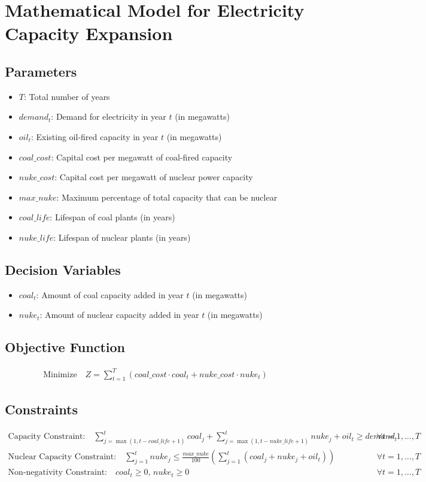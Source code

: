 \documentclass{article}
\begin{document}
\section*{Mathematical Model for Electricity Capacity Expansion}

\subsection*{Parameters}
\begin{itemize}
    \item $T$: Total number of years
    \item $demand_t$: Demand for electricity in year $t$ (in megawatts)
    \item $oil_t$: Existing oil-fired capacity in year $t$ (in megawatts)
    \item $coal\_cost$: Capital cost per megawatt of coal-fired capacity
    \item $nuke\_cost$: Capital cost per megawatt of nuclear power capacity
    \item $max\_nuke$: Maximum percentage of total capacity that can be nuclear
    \item $coal\_life$: Lifespan of coal plants (in years)
    \item $nuke\_life$: Lifespan of nuclear plants (in years)
\end{itemize}

\subsection*{Decision Variables}
\begin{itemize}
    \item $coal_t$: Amount of coal capacity added in year $t$ (in megawatts)
    \item $nuke_t$: Amount of nuclear capacity added in year $t$ (in megawatts)
\end{itemize}

\subsection*{Objective Function}
\begin{align*}
    \text{Minimize} \quad Z = \sum_{t=1}^{T} (coal\_cost \cdot coal_t + nuke\_cost \cdot nuke_t)
\end{align*}

\subsection*{Constraints}
\begin{align*}
    \text{Capacity Constraint:} \quad \sum_{j=\max(1, t - coal\_life + 1)}^{t} coal_j + \sum_{j=\max(1, t - nuke\_life + 1)}^{t} nuke_j + oil_t \geq demand_t & \quad \forall t = 1, \ldots, T \\
    \text{Nuclear Capacity Constraint:} \quad \sum_{j=1}^{t} nuke_j \leq \frac{max\_nuke}{100} \left( \sum_{j=1}^{t} (coal_j + nuke_j + oil_t) \right) & \quad \forall t = 1, \ldots, T \\
    \text{Non-negativity Constraint:} \quad coal_t \geq 0, \, nuke_t \geq 0 & \quad \forall t = 1, \ldots, T
\end{align*}
\end{document}
